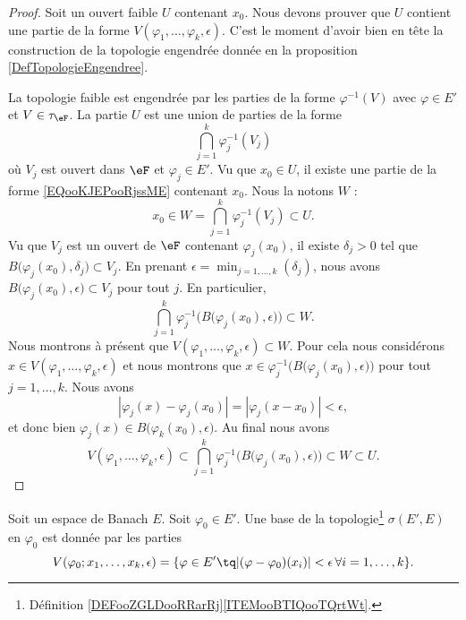 \begin{proof}
	Soit un ouvert faible \( U\) contenant \( x_0\). Nous devons prouver que \( U\) contient une partie de la forme \( V(\varphi_1,\ldots, \varphi_k,\epsilon)\). C'est le moment d'avoir bien en tête la construction de la topologie engendrée donnée en la proposition \ref{DefTopologieEngendree}.

	La topologie faible est engendrée par les parties de la forme \( \varphi^{-1}(V)\) avec \( \varphi\in E'\) et \( V\in \tau_{\eF}\). La partie \( U\) est une union de parties de la forme
	\begin{equation}        \label{EQooKJEPooRjssME}
		\bigcap_{j=1}^k\varphi_j^{-1}(V_j)
	\end{equation}
	où \( V_j\) est ouvert dans \( \eF\) et \( \varphi_j\in E'\). Vu que \( x_0\in U\), il existe une partie de la forme \eqref{EQooKJEPooRjssME} contenant \( x_0\). Nous la notons \( W\) :
	\begin{equation}
		x_0\in W=\bigcap_{j=1}^k\varphi_j^{-1}(V_j)\subset U.
	\end{equation}
	Vu que \( V_j\) est un ouvert de \( \eF\) contenant \( \varphi_j(x_0)\), il existe \( \delta_j>0\) tel que \( B\big( \varphi_j(x_0),\delta_j \big)\subset V_j\). En prenant \( \epsilon=\min_{j=1,\ldots, k}(\delta_j)\), nous avons \( B\big( \varphi_j(x_0),\epsilon \big)\subset V_j\) pour tout \( j\). En particulier,
	\begin{equation}
		\bigcap_{j=1}^k\varphi_j^{-1}\Big( B\big(\varphi_j(x_0),\epsilon\big) \Big)\subset W.
	\end{equation}
	Nous montrons à présent que \( V(\varphi_1,\ldots, \varphi_k,\epsilon)\subset W\). Pour cela nous considérons \( x\in V(\varphi_1,\ldots, \varphi_k,\epsilon)\) et nous montrons que \( x\in\varphi_j^{-1}\Big( B\big( \varphi_j(x_0),\epsilon \big) \Big)\) pour tout \( j=1,\ldots, k\). Nous avons
	\begin{equation}
		| \varphi_j(x)-\varphi_j(x_0) |=| \varphi_j(x-x_0) |<\epsilon,
	\end{equation}
	et donc bien \( \varphi_j(x)\in B\big( \varphi_k(x_0),\epsilon \big)\). Au final nous avons
	\begin{equation}
		V(\varphi_1,\ldots, \varphi_k,\epsilon)\subset\bigcap_{j=1}^k\varphi_j^{-1}\Big( B\big( \varphi_j(x_0),\epsilon \big) \Big)\subset W\subset U.
	\end{equation}
\end{proof}

\begin{proposition}	\label{PROPooMBOJooQcwyuv}
	Soit un espace de Banach \( E\). Soit \( \varphi_0\in E'\). Une base de la topologie\footnote{Définition \ref{DEFooZGLDooRRarRj}\ref{ITEMooBTIQooTQrtWt}.} \( \sigma(E',E)\) en \( \varphi_0\) est donnée par les parties
	\begin{equation}		\label{EQooTINIooJulDll}
		V(\varphi_0;x_1,\ldots,x_k,\epsilon)=\{ \varphi\in E'\tq | (\varphi-\varphi_0)(x_i) |<\epsilon\,\forall i=1,\ldots,k \}.
	\end{equation}
\end{proposition}

